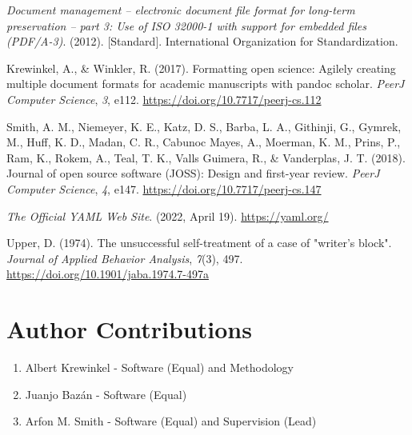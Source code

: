 \documentclass[
]{article}
\newlength{\cslhangindent}
\newlength{\cslentryspacingunit} %
\newenvironment{CSLReferences}[2] %
 {%
  \setlength{\parindent}{0pt}
  \ifodd #1
  \let\oldpar\par
  \def\par{\hangindent=\cslhangindent\oldpar}
  \fi
  \setlength{\parskip}{#2\cslentryspacingunit}
 }%
 {}
\begin{document}
\hypertarget{refs}{}
\begin{CSLReferences}{1}{0}
\leavevmode{}%
\emph{Document management -- electronic document file format for
long-term preservation -- part 3: Use of {ISO} 32000-1 with support for
embedded files ({PDF/A-3})}. (2012). {[}Standard{]}. International
Organization for Standardization.

\leavevmode{}%
Krewinkel, A., \& Winkler, R. (2017). Formatting open science: Agilely
creating multiple document formats for academic manuscripts with pandoc
scholar. \emph{PeerJ Computer Science}, \emph{3}, e112.
\url{https://doi.org/10.7717/peerj-cs.112}

\leavevmode{}%
Smith, A. M., Niemeyer, K. E., Katz, D. S., Barba, L. A., Githinji, G.,
Gymrek, M., Huff, K. D., Madan, C. R., Cabunoc Mayes, A., Moerman, K.
M., Prins, P., Ram, K., Rokem, A., Teal, T. K., Valls Guimera, R., \&
Vanderplas, J. T. (2018). Journal of open source software (JOSS): Design
and first-year review. \emph{PeerJ Computer Science}, \emph{4}, e147.
\url{https://doi.org/10.7717/peerj-cs.147}

\leavevmode{}%
\emph{The {Official YAML Web Site}}. (2022, April 19).
\url{https://yaml.org/}

\leavevmode{}%
Upper, D. (1974). The unsuccessful self-treatment of a case of "writer's
block". \emph{Journal of Applied Behavior Analysis}, \emph{7}(3), 497.
\url{https://doi.org/10.1901/jaba.1974.7-497a}

\end{CSLReferences}

\section{Author Contributions}\label{author-contributions}
\begin{enumerate}
\item Albert Krewinkel - Software (Equal) and Methodology
\item Juanjo Bazán - Software (Equal)
\item Arfon M. Smith - Software (Equal) and Supervision (Lead)
\end{enumerate}
\end{document}
